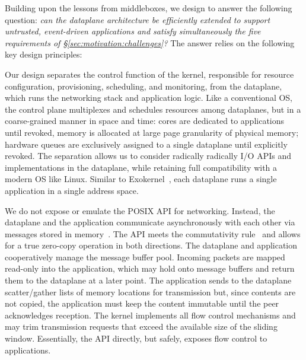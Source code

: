 
Building upon the lessons from middleboxes, we design \ix to answer
the following question: {\it {} can the dataplane architecture be
  efficiently extended to support untrusted, event-driven applications
  and satisfy simultaneously the five requirements of
  \S\ref{sec:motivation:challenges}?}  The answer relies on the
following key design principles:


Our design separates the control function of the kernel, responsible
for resource configuration, provisioning, scheduling, and monitoring,
from the dataplane, which runs the networking stack and application
logic.  Like a conventional OS, the control plane multiplexes and
schedules resources among dataplanes, but in a coarse-grained manner
in space and time: cores are dedicated to applications until revoked,
memory is allocated at large page granularity of physical memory;
hardware queues are exclusively assigned to a single dataplane until
explicitly revoked.  The separation allows us to consider radically
radically I/O APIs and implementations in the dataplane, while
retaining full compatibility with a modern OS like Linux.  Similar to
Exokernel~\cite{DBLP:conf/sosp/EnglerKO95}, each dataplane runs a
single application in a single address space.


 We do
not expose or emulate the POSIX API for networking.  Instead, the
dataplane and the application communicate asynchronously with each
other via messages stored in
memory~\cite{rizzo2012netmap,han2012megapipe}.  The API meets the
commutativity rule~\cite{DBLP:conf/sosp/ClementsKZMK13} and allows for
a true zero-copy operation in both directions. The dataplane and
application cooperatively manage the message buffer pool. Incoming
packets are mapped read-only into the application, which may hold onto
message buffers and return them to the dataplane at a later point.
The application sends to the dataplane scatter/gather lists of memory
locations for transmission but, since contents are not copied, the
application must keep the content immutable until the peer
acknowledges reception. The kernel implements all flow control
mechanisms and may trim transmission requests that exceed the
available size of the sliding window.  Essentially, the API directly,
but safely, exposes flow control to applications.


